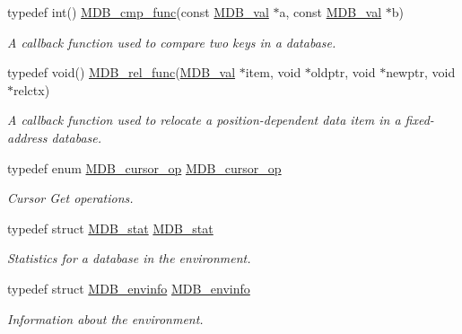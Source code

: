 \begin{DoxyCompactItemize}
typedef int() \mbox{\hyperlink{group__mdb_gac1ea382293d1da331ab88ca59052847d}{M\+D\+B\+\_\+cmp\+\_\+func}}(const \mbox{\hyperlink{struct_m_d_b__val}{M\+D\+B\+\_\+val}} $\ast$a, const \mbox{\hyperlink{struct_m_d_b__val}{M\+D\+B\+\_\+val}} $\ast$b)
\begin{DoxyCompactList}\small\item\em A callback function used to compare two keys in a database. \end{DoxyCompactList}\item 
typedef void() \mbox{\hyperlink{group__mdb_ga311e8b7d73c5e7c03b625a894c5014cb}{M\+D\+B\+\_\+rel\+\_\+func}}(\mbox{\hyperlink{struct_m_d_b__val}{M\+D\+B\+\_\+val}} $\ast$item, void $\ast$oldptr, void $\ast$newptr, void $\ast$relctx)
\begin{DoxyCompactList}\small\item\em A callback function used to relocate a position-\/dependent data item in a fixed-\/address database. \end{DoxyCompactList}\item 
typedef enum \mbox{\hyperlink{group__mdb_ga1206b2af8b95e7f6b0ef6b28708c9127}{M\+D\+B\+\_\+cursor\+\_\+op}} \mbox{\hyperlink{group__mdb_gad2e1aad89e5f072d94d053b6c45d1d28}{M\+D\+B\+\_\+cursor\+\_\+op}}
\begin{DoxyCompactList}\small\item\em Cursor Get operations. \end{DoxyCompactList}\item 
\mbox{\label{group__mdb_ga36740c8749b8609a4c62b6e62ba32f57}} 
typedef struct \mbox{\hyperlink{struct_m_d_b__stat}{M\+D\+B\+\_\+stat}} \mbox{\hyperlink{group__mdb_ga36740c8749b8609a4c62b6e62ba32f57}{M\+D\+B\+\_\+stat}}
\begin{DoxyCompactList}\small\item\em Statistics for a database in the environment. \end{DoxyCompactList}\item 
\mbox{\label{group__mdb_gab571fbd9b2a68e5e2c20fa3bd91e64f4}} 
typedef struct \mbox{\hyperlink{struct_m_d_b__envinfo}{M\+D\+B\+\_\+envinfo}} \mbox{\hyperlink{group__mdb_gab571fbd9b2a68e5e2c20fa3bd91e64f4}{M\+D\+B\+\_\+envinfo}}
\begin{DoxyCompactList}\small\item\em Information about the environment. \end{DoxyCompactList}\item 

\end{DoxyCompactItemize}
